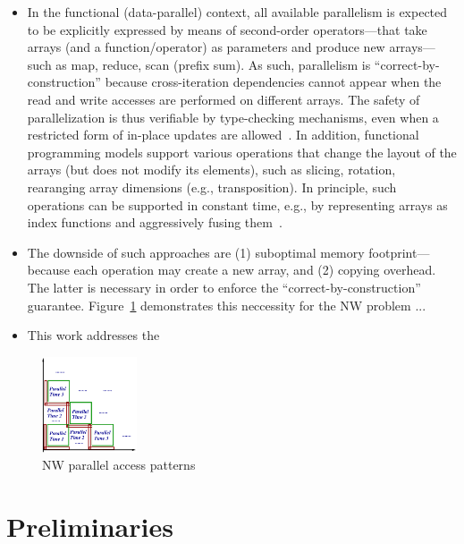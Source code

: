 \documentclass[conference]{IEEEtran}
\begin{document}
\begin{itemize}
\item In the functional (data-parallel) context, all available
        parallelism is expected to be explicitly expressed by means
        of second-order operators---that take arrays (and a function/operator)
        as parameters and produce new arrays---such as map, reduce, scan
        (prefix sum). As such, parallelism is
        ``correct-by-construction'' because cross-iteration
        dependencies cannot appear when the read and write accesses
        are performed on different arrays. The safety of parallelization
        is thus verifiable by type-checking mechanisms, even when
        a restricted form of in-place updates are
        allowed~\cite{futhark-pldi}.
        In addition, functional programming models support various
        operations that change the layout of the arrays (but does not
        modify its elements), such as slicing, rotation, rearanging
        array dimensions (e.g., transposition).   In principle,
        such operations can be supported in constant time, e.g.,
        by representing arrays as index functions and aggressively
        fusing them~\cite{data-par-haskell, svensson2011obsidian}.

\item The downside of such approaches are (1) suboptimal memory
        footprint---because each operation may create a new array,
        and (2) copying overhead.
        The latter is necessary in order to enforce the
        ``correct-by-construction'' guarantee. Figure~\ref{fig:nw-hl}
        demonstrates this neccessity for the NW problem ...

\item This work addresses the
\end{itemize}

\begin{figure}
\centering
\includegraphics[width=0.25\textwidth]{figs/nw-hl}
\caption{NW parallel access patterns}
\label{fig:nw-hl}
\end{figure}


\section{Preliminaries}
\label{sec-prelims}
\end{document}
